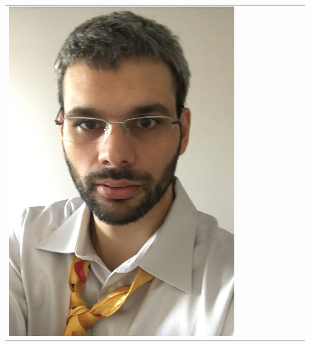 \documentclass[landscape,a0paper,fontscale=0.292]{baposter}
\begin{document}
\begin{poster}
{\begin{center}
\begin{tabularx}{\linewidth}{X X X X X X X X X}
\includegraphics[width=\linewidth]{censi.jpg}&

\end{tabularx}
\end{center}}
\end{poster}
\end{document}
